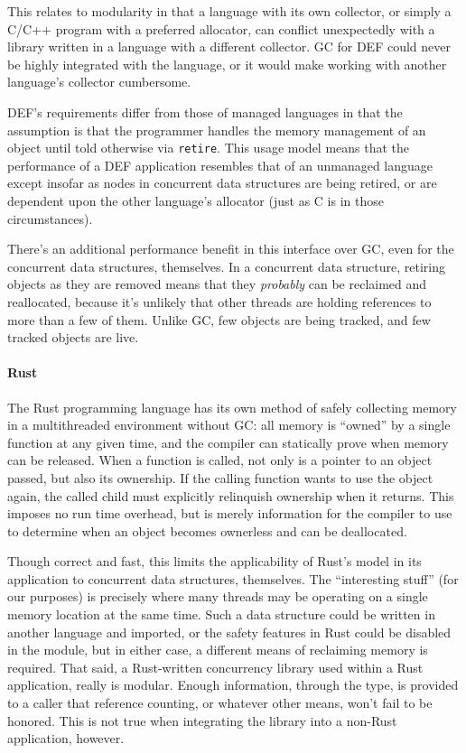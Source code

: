 This relates to modularity in that a language with its own collector, or simply a C/C++ program with a preferred allocator, can conflict unexpectedly with a library written in a language with a different collector.  GC for DEF could never be highly integrated with the language, or it would make working with another language's collector cumbersome.

DEF's requirements differ from those of managed languages in that the assumption is that the programmer handles the memory management of an object until told otherwise via \texttt{retire}.  This usage model means that the performance of a DEF application resembles that of an unmanaged language except insofar as nodes in concurrent data structures are being retired, or are dependent upon the other language's allocator (just as C is in those circumstances).

There's an additional performance benefit in this interface over GC, even for the concurrent data structures, themselves.  In a concurrent data structure, retiring objects as they are removed means that they \textit{probably} can be reclaimed and reallocated, because it's unlikely that other threads are holding references to more than a few of them.  Unlike GC, few objects are being tracked, and few tracked objects are live.

\paragraph{Rust} The Rust programming language has its own method of safely collecting memory in a multithreaded environment without GC: all memory is ``owned'' by a single function at any given time, and the compiler can statically prove when memory can be released.\cite{Rust}  When a function is called, not only is a pointer to an object passed, but also its ownership.  If the calling function wants to use the object again, the called child must explicitly relinquish ownership when it returns.  This imposes no run time overhead, but is merely information for the compiler to use to determine when an object becomes ownerless and can be deallocated.

Though correct and fast, this limits the applicability of Rust's model in its application to concurrent data structures, themselves.  The ``interesting stuff'' (for our purposes) is precisely where many threads may be operating on a single memory location at the same time.  Such a data structure could be written in another language and imported, or the safety features in Rust could be disabled in the module, but in either case, a different means of reclaiming memory is required.  That said, a Rust-written concurrency library used within a Rust application, really is modular.  Enough information, through the type, is provided to a caller that reference counting, or whatever other means, won't fail to be honored.  This is not true when integrating the library into a non-Rust application, however.

